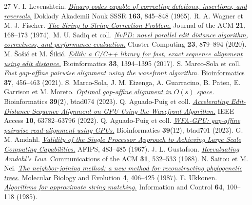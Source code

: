 \begin{thebibliography}{27}
\setlength{\itemsep}{1.5pt plus .4pt}
 V. I. Levenshtein. \href{https://www.mathnet.ru/eng/dan31411}{\emph{Binary codes capable of correcting deletions, insertions, and reversals.}} Doklady Akademii Nauk SSSR \textbf{163}, 845--848 (1965).
 R. A. Wagner et M. J. Fischer. \href{https://doi.org/10.1145/321796.321811}{\emph{The String-to-String Correction Problem.}} Journal of the ACM \textbf{21}, 168--173 (1974).
 M. U. Sadiq et coll. \href{https://doi.org/10.1007/s10586-019-02962-w}{\emph{NvPD: novel parallel edit distance algorithm, correctness, and performance evaluation.}} Cluster Computing \textbf{23}, 879--894 (2020).
 M. Šošić et M. Šikić. \href{https://doi.org/10.1093/bioinformatics/btw753}{\emph{Edlib: a C/C++ library for fast, exact sequence alignment using edit distance.}} Bioinformatics \textbf{33}, 1394--1395 (2017).
 S. Marco-Sola et coll. \href{https://doi.org/10.1093/bioinformatics/btaa777}{\emph{Fast gap-affine pairwise alignment using the wavefront algorithm.}} Bioinformatics \textbf{37}, 456--463 (2021).
 S. Marco-Sola, J. M. Eizenga, A. Guarracino, B. Paten, E. Garrison et M. Moreto. \href{https://doi.org/10.1093/bioinformatics/btad074}{\emph{Optimal gap-affine alignment in \(O(s)\) space.}} Bioinformatics \textbf{39}(2), btad074 (2023).
 Q. Aguado-Puig et coll. \href{https://doi.org/10.1109/ACCESS.2022.3182714}{\emph{Accelerating Edit-Distance Sequence Alignment on GPU Using the Wavefront Algorithm.}} IEEE Access \textbf{10}, 63782--63796 (2022).
 Q. Aguado-Puig et coll. \href{https://doi.org/10.1093/bioinformatics/btad701}{\emph{WFA-GPU: gap-affine pairwise read-alignment using GPUs.}} Bioinformatics \textbf{39}(12), btad701 (2023).
 G. M. Amdahl. \href{https://doi.org/10.1145/1465482.1465560}{\emph{Validity of the Single Processor Approach to Achieving Large Scale Computing Capabilities.}} AFIPS, 483--485 (1967).
 J. L. Gustafson. \href{https://doi.org/10.1145/42411.42415}{\emph{Reevaluating Amdahl's Law.}} Communications of the ACM \textbf{31}, 532--533 (1988).
 N. Saitou et M. Nei. \href{https://doi.org/10.1093/oxfordjournals.molbev.a040454}{\emph{The neighbor-joining method: a new method for reconstructing phylogenetic trees.}} Molecular Biology and Evolution \textbf{4}, 406--425 (1987).
 E. Ukkonen. \href{https://doi.org/10.1016/S0019-9958(85)80046-2}{\emph{Algorithms for approximate string matching.}} Information and Control \textbf{64}, 100--118 (1985).

\end{thebibliography}

